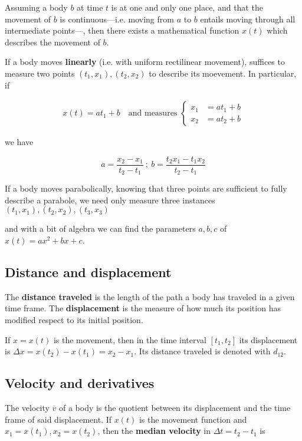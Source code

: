 \documentclass[a4paper, 12pt]{article}
\begin{document}
Assuming a body $b$ at time $t$ is at one and only one place, and that 
the movement of $b$ is continuous---i.e. moving from $a$ to $b$ entails 
moving through all intermediate points---, then there exists 
a mathematical function $x(t)$ which describes the movement of $b$.

If a body moves \textbf{linearly} (i.e. with uniform rectilinear movement),
suffices to measure two points $(t_1, x_1), (t_2, x_2)$ to describe 
its moevement. In particular, if 

\begin{align*}
    x(t) = at_1 + b ~ ~ ~ \text{ and measures } \begin{cases}
        x_1 &= at_1 + b \\ 
        x_2 &= at_2 + b
    \end{cases}
\end{align*}

we have 

\begin{equation*}
a = \frac{x_2 - x_1}{t_2 - t_1} ~ ; ~ b = \frac{t_2x_1 - t_{1}x_2}{t_2 - t_1}
\end{equation*}

If a body moves parabolically, knowing that three points are sufficient to 
fully describe a parabole, we need only measure three instances 
$(t_1, x_1), (t_2, x_2), (t_3, x_3)$

and with a bit of algebra we can find the parameters $a, b, c$ of $x(t) = ax^2 + bx + c$.

\subsection{Distance and displacement}

The \textbf{distance traveled} is the length of the path a body has traveled 
in a given time frame. The \textbf{displacement} is the measure of how 
much its position has modified respect to its initial position.

If $x = x(t)$ is the movement, then in the time interval $[t_1, t_2]$
its displacement is $\Delta x = x(t_2) - x(t_1) = x_2 - x_1$. 
Its distance traveled is denoted with $d_{12}$.

\subsection{Velocity and derivatives}

The velocity $\overline{v}$ of a body is the quotient between its 
displacement and the time frame of said displacement. If $x(t)$
is the movement function and $x_1 = x(t_1), x_2 = x(t_2)$, then 
the \textbf{median velocity} in $\Delta t = t_2 - t_1$ is 
\end{document}

